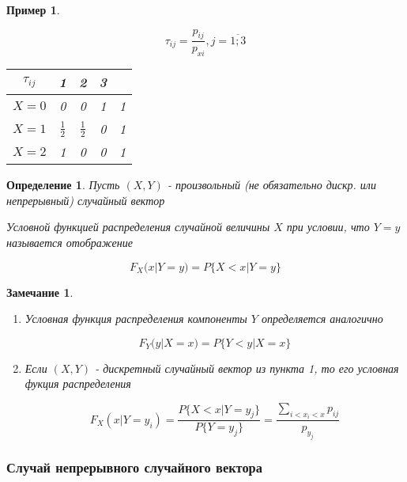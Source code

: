 \documentclass[a4paper, 14pt]{report}
\newtheorem{defenition}{Определение}[section]
\newtheorem{note}{Замечание}[section]
\newtheorem{example}{Пример}[section]
\begin{document}
\begin{example}
\begin{enumerate}
            $$
            \tau_{ij} = \frac{p_{ij}}{p_{xi}}, j = \overline{1;3}
            $$

            \begin{table}[H]
                \centering
                \begin{tabular}{|c||c|c|c||c|}
                    \hline
                    $\tau_{ij}$ & 1 & 2 & 3 & \\
                    \hline
                    \hline
                    $X=0$  & 0 & 0 & 1 & 1\\
                    \hline
                    $X=1$ & $\frac{1}{2}$ & $\frac{1}{2}$ & 0 & 1 \\
                    \hline
                    $X=2$ & 1 & 0 & 0 & 1 \\
                    \hline
                \end{tabular}
            \end{table}
    \end{enumerate}
\end{example}

\begin{defenition}
    Пусть $(X,Y)$ - произвольный (не обязательно дискр. или непрерывный) случайный вектор

    Условной функцией распределения случайной величины $X$ при условии, что $Y=y$ называется отображение 

    $$
    F_X(x|Y=y) = P\{ X < x | Y = y \}
    $$
\end{defenition}

\begin{note}
    \begin{enumerate}
        \item Условная функция распределения компоненты $Y$ определяется аналогично

            $$
            F_Y(y|X=x) = P \{Y<y | X=x\}
            $$

        \item Если $(X,Y)$ - дискретный случайный вектор из пункта 1, то его условная фукция распределения

            $$
            F_X(x|Y=y_i) = \frac{P\{X<x|Y=y_j\}}{P\{Y=y_j\}} = \frac{\sum_{i < x_i < x} p_{ij}}{p_{y_j}}
            $$
    \end{enumerate}
\end{note}

\subsubsection{Случай непрерывного случайного вектора}
\end{document}
